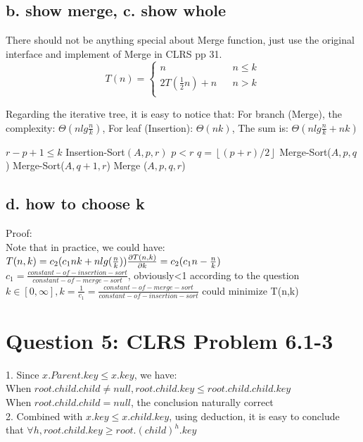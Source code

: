 \documentclass[]{article}
\begin{document}
\subsection{b. show merge, c. show whole}

There should not be anything special about Merge function, just use the original interface and implement of Merge in CLRS pp 31.\\
$$ T(n)=\left\{
\begin{array}{lcl}
 n       &      & {n \le k}\\
2T(\frac{1}{2}n) + n     &      & {n > k}\\
\end{array} \right. $$

Regarding the iterative tree, it is easy to notice that:
For branch (Merge), the complexity: $\Theta(nlg\frac{n}{k})$, For leaf (Insertion): $\Theta(nk)$, The sum is: $\Theta (nlg\frac{n}{k} + nk) $

\begin{codebox}
	\li \If $r-p + 1 \le k$
	\li \Then   Insertion-Sort$(A,p,r)$
	\li 		\Return
	\li \ElseIf $p < r$
	\li \Then	$q = \left \lfloor (p+r)/2 \right \rfloor$
	\li 		Merge-Sort($A, p, q$)
	\li			Merge-Sort($A, q+1, r$)
	\li			Merge ($A, p, q, r$)
	\li			\Return
	\li \Else  \Return
	\End
\end{codebox}

\subsection{d. how to choose k}
Proof:\\
Note that in practice, we could have:\\
$T(n,k) = c_{2} (c_{1}nk + nlg(\frac{n}{k}))\\
\frac{\partial T(n,k)}{\partial k} = c_{2} (c_{1}n - \frac{n}{k})$\\
$c_{1} = \frac{constant-of-insertion-sort}{constant-of-merge-sort}$, obviously<1 according to the question\\
$k \in [0, \infty], k = \frac{1}{c_{1}} = \frac{constant-of-merge-sort}{constant-of-insertion-sort} $ could minimize T(n,k)

\section{Question 5: CLRS Problem 6.1-3}
1. Since $x.Parent.key \le x.key$, we have:\\
When $root.child.child \neq null, root.child.key \le root.child.child.key$\\
When $root.child.child = null$, the conclusion naturally correct\\
2. Combined with $x.key \le x.child.key$, using deduction, it is easy to conclude that $\forall h, root.child.key \ge root.(child)^{h}.key$
\end{document}
